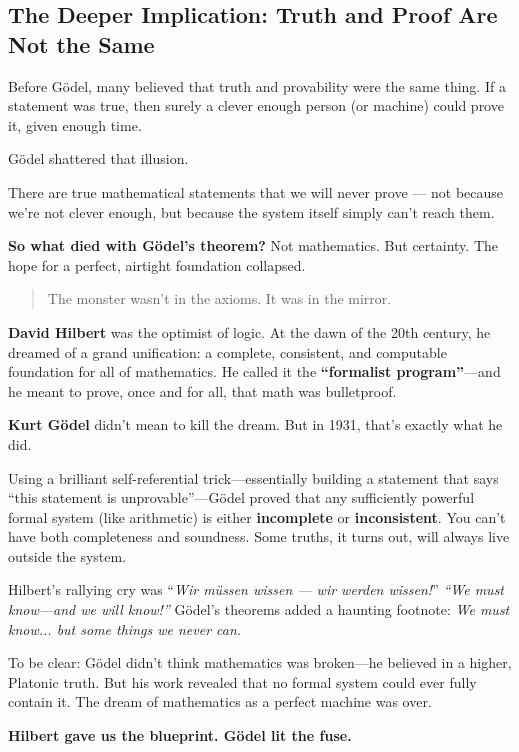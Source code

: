 \subsection{The Deeper Implication: Truth and Proof Are Not the Same}

Before Gödel, many believed that truth and provability were the same thing. If a statement was true, then surely a clever enough person (or machine) could prove it, given enough time.

Gödel shattered that illusion.

There are true mathematical statements that we will never prove — not because we’re not clever enough, but because the system itself simply can’t reach them.

\textbf{So what died with Gödel’s theorem?} Not mathematics. But certainty. The hope for a perfect, airtight foundation collapsed.

\begin{quote}
The monster wasn’t in the axioms. It was in the mirror.
\end{quote}


\begin{tcolorbox}[colback=blue!5!white, colframe=blue!50!black, 
  title={Historical Sidebar: Gödel and Hilbert—The Dream and the Detonation}]
  
  \textbf{David Hilbert} was the optimist of logic. At the dawn of the 20th century, he dreamed of a grand unification: a complete, consistent, and computable foundation for all of mathematics. He called it the \textbf{“formalist program”}—and he meant to prove, once and for all, that math was bulletproof.
  
  \medskip
  
  \textbf{Kurt Gödel} didn’t mean to kill the dream. But in 1931, that’s exactly what he did.
  
  Using a brilliant self-referential trick—essentially building a statement that says “this statement is unprovable”—Gödel proved that any sufficiently powerful formal system (like arithmetic) is either \textbf{incomplete} or \textbf{inconsistent}. You can’t have both completeness and soundness. Some truths, it turns out, will always live outside the system.
  
  \medskip
  
  Hilbert’s rallying cry was “\textit{Wir müssen wissen — wir werden wissen!}”  
  \emph{“We must know—and we will know!”}  
  Gödel’s theorems added a haunting footnote:  
  \emph{We must know... but some things we never can.}
  
  \medskip
  
  To be clear: Gödel didn’t think mathematics was broken—he believed in a higher, Platonic truth. But his work revealed that no formal system could ever fully contain it. The dream of mathematics as a perfect machine was over.
  
  \medskip
  
  \textbf{Hilbert gave us the blueprint. Gödel lit the fuse.}
  
\end{tcolorbox}

